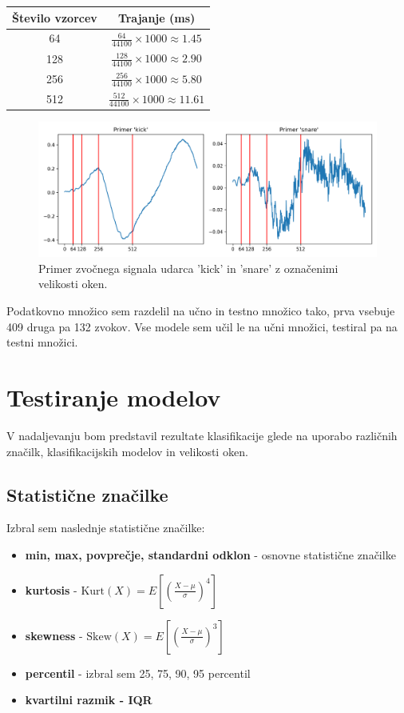 \documentclass[11pt,a4paper]{article}
\begin{document}
\begin{center}
    \begin{tabular}{c c}
        \textbf{Število vzorcev} & \textbf{Trajanje (ms)} \\
        \hline
        64 & $\frac{64}{44100} \times 1000 \approx 1.45$ \\
        128 & $\frac{128}{44100} \times 1000 \approx 2.90$ \\
        256 & $\frac{256}{44100} \times 1000 \approx 5.80$ \\
        512 & $\frac{512}{44100} \times 1000 \approx 11.61$ \\
        \hline
    \end{tabular}
\end{center}

\begin{figure}[h]
    \centering
    \includegraphics[width=\textwidth]{img/primer_kick_snare_windows_hard.png}
    \caption{Primer zvočnega signala udarca 'kick' in 'snare' z označenimi velikosti oken.}
    \label{fig:primer_kick_snare_windows_hard}
\end{figure}


Podatkovno množico sem razdelil na učno in testno množico tako, prva vsebuje 409 druga pa 132 zvokov. Vse modele sem učil le na učni množici, testiral pa na testni množici. 

\section{Testiranje modelov}
V nadaljevanju bom predstavil rezultate klasifikacije glede na uporabo različnih značilk, klasifikacijskih modelov in velikosti oken.

\subsection{Statistične značilke}
Izbral sem naslednje statistične značilke:
\begin{itemize}
    \item \textbf{min, max, povprečje, standardni odklon} - osnovne statistične značilke
    \item \textbf{kurtosis} - $\text{Kurt}(X) = E\left[ \left( \frac{X - \mu}{\sigma} \right)^4 \right] $
    \item \textbf{skewness} - $\text{Skew}(X) = E\left[ \left( \frac{X - \mu}{\sigma} \right)^3 \right] $
    \item \textbf{percentil} - izbral sem 25, 75, 90, 95 percentil
    \item \textbf{kvartilni razmik - IQR}
\end{itemize}
\end{document}
